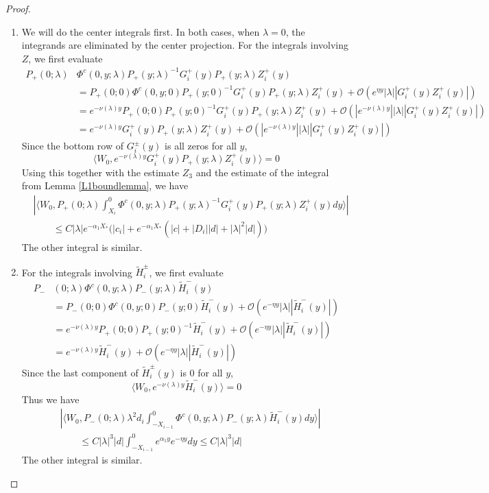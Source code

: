 \documentclass[thesis.tex]{subfiles}
\begin{document}
\begin{lemma}
\begin{proof}
\begin{enumerate}
\item We will do the center integrals first. In both cases, when $\lambda = 0$, the integrands are eliminated by the center projection. For the integrals involving $Z$, we first evaluate
\begin{align*}
P_+(0; \lambda) &\Phi^c(0, y; \lambda) P_+(y; \lambda)^{-1} G_i^+(y) P_+(y; \lambda) Z_i^+(y) \\
&= P_+(0; 0) \Phi^c(0, y; 0) P_+(y; 0)^{-1} G_i^+(y) P_+(y; \lambda) Z_i^+(y) + \mathcal{O}(e^{\eta y}|\lambda||G_i^+(y) Z_i^+(y)|) \\
&= e^{-\nu(\lambda) y} P_+(0; 0) P_+(y; 0)^{-1} G_i^+(y) P_+(y; \lambda) Z_i^+(y) + \mathcal{O}(|e^{-\nu(\lambda) y}||\lambda||G_i^+(y) Z_i^+(y)|) \\
&= e^{-\nu(\lambda) y} G_i^+(y) P_+(y; \lambda) Z_i^+(y) + \mathcal{O}(|e^{-\nu(\lambda) y}||\lambda||G_i^+(y) Z_i^+(y)|)
\end{align*}
Since the bottom row of $G_i^\pm(y)$ is all zeros for all $y$, 
\[
\langle W_0, e^{-\nu(\lambda) y} G_i^+(y) P_+(y; \lambda) Z_i^+(y) \rangle = 0
\]
Using this together with the estimate $Z_3$ and the estimate of the integral from Lemma \ref{L1boundlemma}, we have
\begin{align*}
&\left| \langle W_0, P_+(0; \lambda) \int_{X_i}^0 \Phi^c(0, y; \lambda) P_+(y; \lambda)^{-1} G_i^+(y) P_+(y; \lambda) Z_i^+(y) dy \rangle \right| \\
&\qquad \leq C |\lambda| e^{-\alpha_1 X_*}\Big(|c_i| + e^{-\alpha_1 X_*}\left(|c| + |D_i||d| + |\lambda|^2|d|\right) \Big)
\end{align*}
The other integral is similar.

\item For the integrals involving $\tilde{H}_i^\pm$, we first evaluate
\begin{align*}
P_-&(0; \lambda) \Phi^c(0, y; \lambda) P_-(y; \lambda) \tilde{H}_i^-(y) \\
&= P_-(0; 0) \Phi^c(0, y; 0) P_-(y; 0) \tilde{H}_i^-(y) + \mathcal{O}(e^{-\eta y}|\lambda||\tilde{H}_i^-(y)|) \\
&= e^{-\nu(\lambda) y} P_+(0; 0) P_+(y; 0)^{-1}\tilde{H}_i^-(y) + \mathcal{O}(e^{-\eta y}|\lambda||\tilde{H}_i^-(y)|)  \\
&= e^{-\nu(\lambda) y} \tilde{H}_i^-(y) + \mathcal{O}(e^{-\eta y}|\lambda||\tilde{H}_i^-(y)|) 
\end{align*}
Since the last component of $\tilde{H}_i^\pm(y)$ is 0 for all $y$,
\[
\langle W_0, e^{-\nu(\lambda) y} \tilde{H}_i^-(y) \rangle = 0
\]
Thus we have
\begin{align*}
&\left| \langle W_0, P_-(0; \lambda) \lambda^2 d_i \int_{-X_{i-1}}^0 \Phi^c(0, y; \lambda) P_-(y; \lambda) \tilde{H}_i^-(y) dy \rangle \right| \\
&\qquad \leq C |\lambda|^3 |d| \int_{-X_{i-1}}^0 e^{\alpha_1 y} e^{-\eta y} dy \leq C |\lambda|^3 |d| 
\end{align*}
The other integral is similar.


\end{enumerate}
\end{proof}
\end{lemma}
\end{document}
